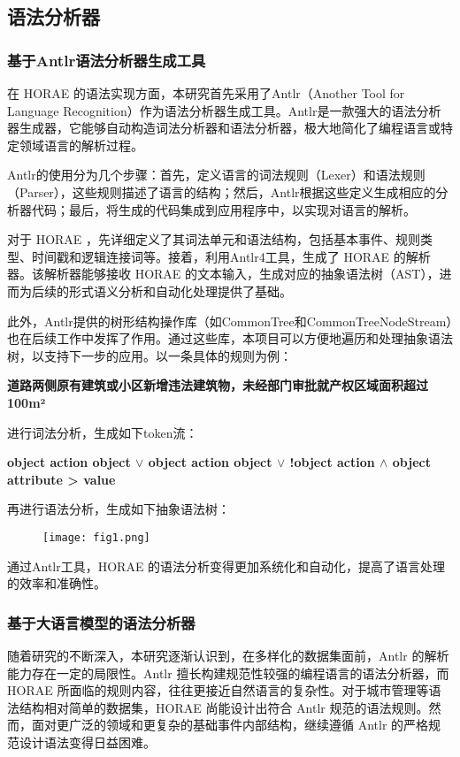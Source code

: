 \subsection{语法分析器}

\subsubsection{基于Antlr语法分析器生成工具}

在 HORAE 的语法实现方面，本研究首先采用了Antlr（Another Tool for Language Recognition）作为语法分析器生成工具。Antlr是一款强大的语法分析器生成器，它能够自动构造词法分析器和语法分析器，极大地简化了编程语言或特定领域语言的解析过程。

Antlr的使用分为几个步骤：首先，定义语言的词法规则（Lexer）和语法规则（Parser），这些规则描述了语言的结构；然后，Antlr根据这些定义生成相应的分析器代码；最后，将生成的代码集成到应用程序中，以实现对语言的解析。

对于 HORAE ，先详细定义了其词法单元和语法结构，包括基本事件、规则类型、时间戳和逻辑连接词等。接着，利用Antlr4工具，生成了 HORAE 的解析器。该解析器能够接收 HORAE 的文本输入，生成对应的抽象语法树（AST），进而为后续的形式语义分析和自动化处理提供了基础。

此外，Antlr提供的树形结构操作库（如CommonTree和CommonTreeNodeStream）也在后续工作中发挥了作用。通过这些库，本项目可以方便地遍历和处理抽象语法树，以支持下一步的应用。以一条具体的规则为例：

\textbf{道路两侧原有建筑或小区新增违法建筑物，未经部门审批就产权区域面积超过100m²}

进行词法分析，生成如下token流：

\textbf{object action object $\lor$ object action object $\lor$ !object action $\land$ object attribute > value}


再进行语法分析，生成如下抽象语法树：

\begin{figure}[ht]
    \centering
    \texttt{[image: fig1.png]}
\end{figure}

通过Antlr工具，HORAE 的语法分析变得更加系统化和自动化，提高了语言处理的效率和准确性。

\subsubsection{基于大语言模型的语法分析器}

随着研究的不断深入，本研究逐渐认识到，在多样化的数据集面前，Antlr 的解析能力存在一定的局限性。Antlr 擅长构建规范性较强的编程语言的语法分析器，而 HORAE 所面临的规则内容，往往更接近自然语言的复杂性。对于城市管理等语法结构相对简单的数据集，HORAE 尚能设计出符合 Antlr 规范的语法规则。然而，面对更广泛的领域和更复杂的基础事件内部结构，继续遵循 Antlr 的严格规范设计语法变得日益困难。

